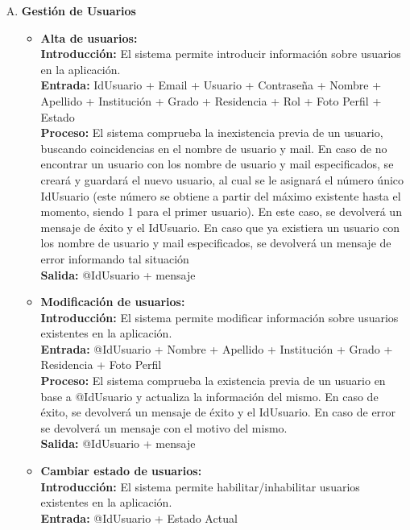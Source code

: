     \begin{enumerate}[A.]
      \item \textbf{Gestión de Usuarios}
        \begin{itemize}  
          \item \textbf{Alta de usuarios:}
            \\ \textbf{Introducción:} El sistema permite introducir información sobre usuarios en la aplicación.
            \\ \textbf{Entrada:} IdUsuario + Email + Usuario + Contraseña + Nombre + Apellido + Institución + Grado + Residencia + Rol + Foto Perfil + Estado 
            \\ \textbf{Proceso:} El sistema comprueba la inexistencia previa de un usuario, buscando coincidencias en el nombre de usuario y mail. En caso de no encontrar un usuario con los nombre de usuario y mail especificados, se creará y guardará el nuevo usuario, al cual se le asignará el número único IdUsuario (este número se obtiene a partir del máximo existente hasta el momento, siendo 1 para el primer usuario). En este caso, se devolverá un mensaje de éxito y el IdUsuario. En caso que ya existiera un usuario con los nombre de usuario y mail especificados, se devolverá un mensaje de error informando tal situación
            \\ \textbf{Salida:} @IdUsuario + mensaje
            \\
          \item \textbf{Modificación de usuarios:}
            \\ \textbf{Introducción:} El sistema permite modificar información sobre usuarios existentes en la aplicación.
            \\ \textbf{Entrada:} @IdUsuario + Nombre + Apellido + Institución + Grado + Residencia + Foto Perfil
            \\ \textbf{Proceso:} El sistema comprueba la existencia previa de un usuario en base a @IdUsuario y actualiza la información del mismo. En caso de éxito, se devolverá un mensaje de éxito y el IdUsuario. En caso de error se devolverá un mensaje con el motivo del mismo.
            \\ \textbf{Salida:} @IdUsuario + mensaje
            \\
          \item \textbf{Cambiar estado de usuarios:}
            \\ \textbf{Introducción:} El sistema permite habilitar/inhabilitar usuarios existentes en la aplicación.
            \\ \textbf{Entrada:} @IdUsuario + Estado Actual

\end{itemize}
\end{enumerate}
